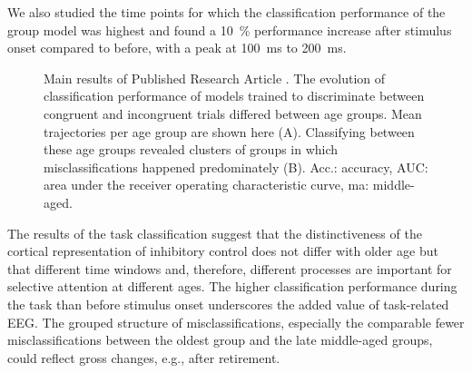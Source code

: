 We also studied the time points for which the classification performance of the group model was highest and found a 10~\% performance increase after stimulus onset compared to before, with a peak at 100~ms to 200~ms.

\begin{figure}[h]
\begin{center}

\caption[Main results of Published Research Article .]{Main results of Published Research Article . The evolution of classification performance of models trained to discriminate between congruent and incongruent trials differed between age groups. Mean trajectories per age group are shown here (A). Classifying between these age groups revealed clusters of groups in which misclassifications happened predominately (B). Acc.: accuracy, AUC: area under the receiver operating characteristic curve, ma: middle-aged.}
\label{fig:results2}
\end{center}
\end{figure}
\noindent The results of the task classification suggest that the distinctiveness of the cortical representation of inhibitory control does not differ with older age but that different time windows and, therefore, different processes are important for selective attention at different ages. The higher classification performance during the task than before stimulus onset underscores the added value of task-related EEG. The grouped structure of misclassifications,  especially the comparable fewer misclassifications between the oldest group and the late middle-aged groups, could reflect gross changes, e.g., after retirement. 


